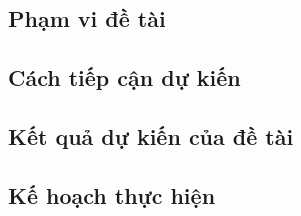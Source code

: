 \subsection{Phạm vi đề tài}

\subsection{Cách tiếp cận dự kiến}

\subsection{Kết quả dự kiến của đề tài}

\subsection{Kế hoạch thực hiện}